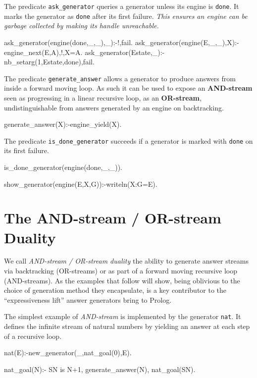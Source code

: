 \documentclass{new_tlp}
\begin{document}
The predicate {\tt ask\_generator} queries a generator unless its engine is {\tt done}.
It marks the generator as {\tt done} after its first failure.
{\em This ensures an engine can be garbage collected by making its handle unreachable.}
\begin{code}  
ask_generator(engine(done,_,_),_):-!,fail.
ask_generator(engine(E,_,_),X):-engine_next(E,A),!,X=A.
ask_generator(Estate,_):-nb_setarg(1,Estate,done),fail.  
\end{code}

The predicate {\tt generate\_answer} allows a generator to produce answers from inside a forward moving loop. As such it can be used to expose an {\bf AND-stream} seen as progressing  in a linear recursive loop, as an {\bf OR-stream}, undistinguishable from answers generated by an engine on backtracking.
\begin{code}
generate_answer(X):-engine_yield(X).
\end{code}
The predicate {\tt is\_done\_generator} succeeds if a generator is marked with {\tt done} on its first failure.

\begin{code}
is_done_generator(engine(done,_,_)).
\end{code}

\begin{codeh}
show_generator(engine(E,X,G)):-writeln(X:G=E).
\end{codeh}

\section{The AND-stream / OR-stream Duality}

We call {\em AND-stream / OR-stream duality} the
ability to generate answer streams via backtracking (OR-streams) or
as part of a forward moving recursive loop (AND-streams).
As the examples that follow will show,
being oblivious to the choice of generation method they encapsulate,
is a key contributor to the ``expressiveness lift'' answer generators
bring to Prolog.

The simplest example of {\em AND-stream} is  implemented
by the generator {\tt nat}. It defines the infinite stream of natural numbers 
by yielding an answer at each step of a recursive loop.
\begin{code}
nat(E):-new_generator(_,nat_goal(0),E).

nat_goal(N):-
  SN is N+1,
  generate_answer(N),
  nat_goal(SN).
\end{code}
\end{document}
